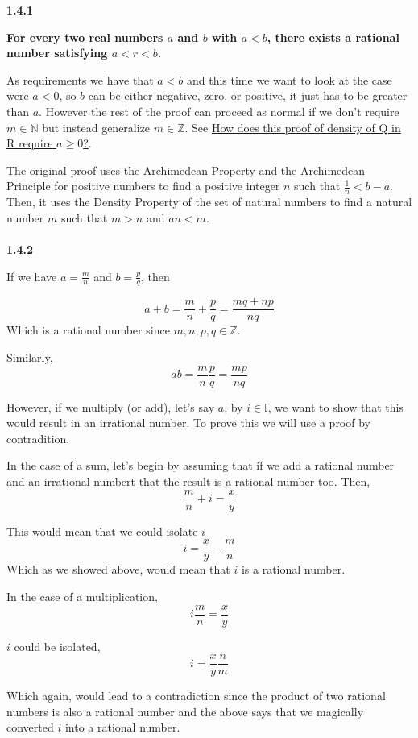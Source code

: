 \textbf{1.4.1}

\textbf{For every two real numbers $a$ and $b$ with $a<b$, there exists a rational number satisfying $a < r < b$.}

As requirements we have that $a<b$ and this time we want to look at the case were $a<0$,
so $b$ can be either negative, zero, or positive, it just has to be greater than $a$.
However the rest of the proof can proceed as normal if we don't require $m \in \mathbb{N}$ but
instead generalize $m \in \mathbb{Z}$.
See
\href{https://math.stackexchange.com/questions/48537/how-does-this-proof-of-density-of-mathbbq-in-mathbbr-require-a-geq-0}{How does this proof of density of Q in R require $a\geq 0$?}.

The original proof uses the Archimedean Property and the Archimedean Principle for positive
numbers to find a positive integer $n$ such that $\frac{1}{n} < b - a$.
Then, it uses the Density Property of the set of natural numbers to find a natural number $m$
such that $m > n$ and $an < m$.
\\~\\



\textbf{1.4.2}

If we have $a = \frac{m}{n}$ and $b = \frac{p}{q}$, then

$$
a + b = \frac{m}{n} + \frac{p}{q}
    = \frac{mq + np}{nq}
$$
Which is a rational number since $m, n, p, q \in \mathbb{Z}$.

Similarly,
$$
ab = \frac{m}{n} \frac{p}{q}
    = \frac{mp}{nq}
$$

However, if we multiply (or add), let's say $a$, by $i \in \mathbb{I}$, we want to show that this would result in an irrational number.
To prove this we will use a proof by contradition.

In the case of a sum, let's begin by assuming that if we add a rational number and an irrational numbert
that the result is a rational number too.
Then,
$$
\frac{m}{n} + i = \frac{x}{y}
$$

This would mean that we could isolate $i$
$$
i = \frac{x}{y} - \frac{m}{n}
$$
Which as we showed above, would mean that $i$ is a rational number.

In the case of a multiplication,
$$
i \frac{m}{n} = \frac{x}{y}
$$

$i$ could be isolated,
$$
i = \frac{x}{y} \frac{n}{m}
$$

Which again, would lead to a contradiction since the product of two rational numbers is also a rational number
and the above says that we magically converted $i$ into a rational number.

